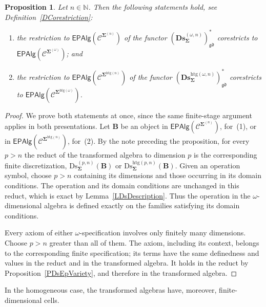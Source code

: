 \documentclass[a4paper, reqno]{amsbook}
\newcommand{\sig}[1]{\mathbf{#1}}             %
\newcommand{\spec}[1]{\boldsymbol{\mathcal{#1}}} %
\newcommand{\gd}{\mathfrak{gd}}              %
\newcommand{\htg}{\mathrm{htg}}                %
\newcommand{\Ds}{\mathrm{Ds}}
\newcommand{\bDs}{\mathbf{Ds}}
\theoremstyle{plain}
\newtheorem{proposition}[theorem]{Proposition}
\theoremstyle{definition}
\begin{document}
\begin{proposition}\label{PDsEpVarietyOmega}
Let $n\in\mathbb{N}$.
Then the following statements hold, see Definition~\ref{DCorestriction}:
\begin{enumerate}
\item the restriction to $\mathsf{EPAlg}(\spec{C}^{\sig{\Sigma}^{(n)}})$ of the functor $(\bDs^{(\omega,n)}_{\sig{\Sigma}})^{\ast}_{\gd}$ corestricts to $\mathsf{EPAlg}(\spec{C}^{\sig{\Sigma}^{(\omega)}})$; and
\item the restriction to $\mathsf{EPAlg}(\spec{C}^{\sig{\Sigma}^{\htg(n)}})$ of the functor $(\bDs^{\htg(\omega,n)}_{\sig{\Sigma}})^{\ast}_{\gd}$ corestricts to $\mathsf{EPAlg}(\spec{C}^{\sig{\Sigma}^{\htg(\omega)}})$.
\end{enumerate}
\end{proposition}
\begin{proof}
We prove both statements at once, since the same finite-stage argument applies in both presentations.
Let $\mathbf{B}$ be an object in $\mathsf{EPAlg}(\spec{C}^{\sig{\Sigma}^{(n)}})$, for~(1), or in $\mathsf{EPAlg}(\spec{C}^{\sig{\Sigma}^{\htg(n)}})$, for~(2).
By the note preceding the proposition, for every $p>n$ the reduct of the transformed algebra to dimension $p$ is the corresponding finite discretization, $\Ds^{(p,n)}_{\sig{\Sigma}}(\mathbf{B})$ or $\Ds^{\htg(p,n)}_{\sig{\Sigma}}(\mathbf{B})$.
Given an operation symbol, choose $p>n$ containing its dimensions and those occurring in its domain conditions.
The operation and its domain conditions are unchanged in this reduct, which is exact by Lemma~\ref{LDsDescription}.
Thus the operation in the $\omega$-dimensional algebra is defined exactly on the families satisfying its domain conditions.

Every axiom of either $\omega$-specification involves only finitely many dimensions.
Choose $p>n$ greater than all of them.
The axiom, including its context, belongs to the corresponding finite specification; its terms have the same definedness and values in the reduct and in the transformed algebra.
It holds in the reduct by Proposition~\ref{PDsEpVariety}, and therefore in the transformed algebra.
\end{proof}

In the homogeneous case, the transformed algebras have, moreover, finite-dimensional cells.
\end{document}
